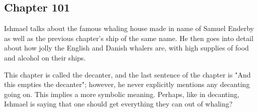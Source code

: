 \subsection{Chapter 101}

Ishmael talks about the famous whaling house made in name of Samuel Enderby as
well as the previous chapter's ship of the same name. He then goes into detail
about how jolly the English and Danish whalers are, with high supplies of food
and alcohol on their ships.

This chapter is called the decanter, and the last sentence of the chapter is
"And this empties the decanter"; however, he never explicitly mentions any
decanting going on. This implies a more symbolic meaning. Perhaps, like in
decanting, Ishmael is saying that one should get everything they can out of
whaling?
